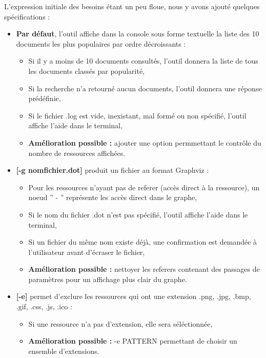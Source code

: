\documentclass[a4paper]{article}
\begin{document}
	
	\bigbreak
	L'expression initiale des besoins étant un peu floue, nous y avons ajouté quelques spécifications :\\
	\begin{itemize}[label=\textbullet]
		\item \textbf{Par défaut}, l'outil affiche dans la console sous forme textuelle la liste des 10 documents les plus populaires par ordre décroissants :
					\begin{itemize}
							\item Si il y a moins de 10 documents consultés, l'outil donnera la liste de tous les documents classés par popularité,
							\item Si la recherche n'a retourné aucun documents, l'outil donnera une réponse prédéfinie,
							\item Si le fichier .log est vide, inexistant, mal formé ou non spécifié, l'outil affiche l'aide dans le terminal,
							\item \textbf{Amélioration possible :} ajouter une option permmettant le contrôle du nombre de ressources affichées.
					\end{itemize}
		\item{} \textbf{[-g nomfichier.dot]} produit un fichier au format Graphviz :
					\begin{itemize}
							\item Pour les ressources n'ayant pas de referer (accès direct à la ressource), un noeud '' - '' représente les accès direct dans le graphe,
							\item Si le nom du fichier .dot n'est pas spécifié, l'outil affiche l'aide dans le terminal,
							\item Si un fichier du même nom existe déjà, une confirmation est demandée à l'utilisateur avant d'écraser le fichier,
							\item \textbf{Amélioration possible :} nettoyer les referers contenant des passages de paramètres pour un affichage plus clair du graphe.
					\end{itemize}
		\item{} \textbf{[-e]} permet d'exclure les ressources qui ont une extension .png, .jpg, .bmp, .gif, .css, .js, .ico :
					\begin{itemize}
							\item Si une ressource n'a pas d'extension, elle sera séléctionnée,
							\item \textbf{Amélioration possible :} -e PATTERN permettant de choisir un ensemble d'extensions.
					\end{itemize}

\end{itemize}
\end{document}
